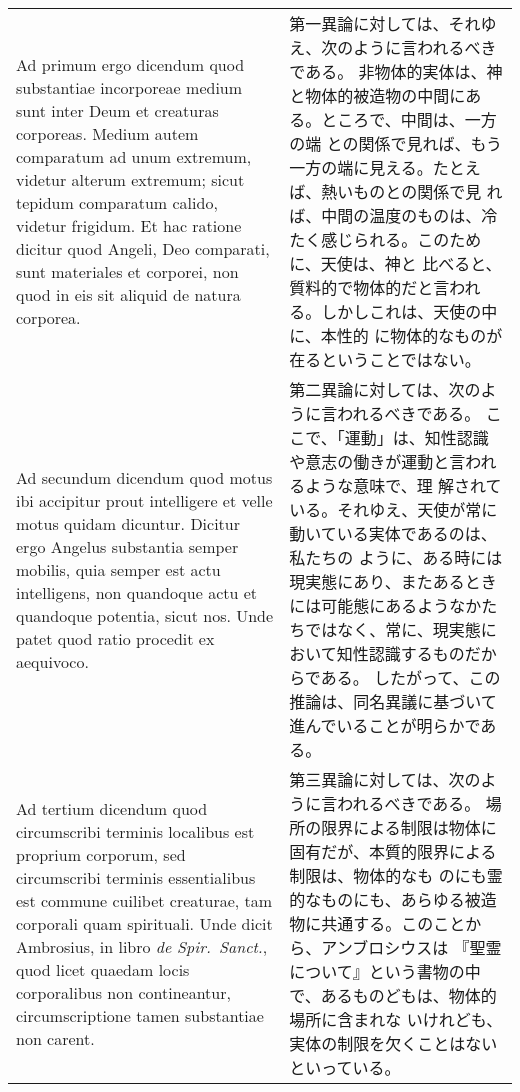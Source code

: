 \documentclass[10pt]{jsarticle} %
\begin{document}
\begin{longtable}{p{21em}p{21em}}
\\


Ad primum ergo dicendum quod substantiae
incorporeae medium sunt inter Deum et creaturas corporeas. Medium autem
comparatum ad unum extremum, videtur alterum extremum; sicut tepidum
comparatum calido, videtur frigidum. Et hac ratione dicitur quod Angeli,
Deo comparati, sunt materiales et corporei, non quod in eis sit aliquid
de natura corporea.


&

第一異論に対しては、それゆえ、次のように言われるべきである。
非物体的実体は、神と物体的被造物の中間にある。ところで、中間は、一方の端
 との関係で見れば、もう一方の端に見える。たとえば、熱いものとの関係で見
 れば、中間の温度のものは、冷たく感じられる。このために、天使は、神と
 比べると、質料的で物体的だと言われる。しかしこれは、天使の中に、本性的
 に物体的なものが在るということではない。


 
\\


Ad secundum dicendum quod motus ibi accipitur
prout intelligere et velle motus quidam dicuntur. Dicitur ergo Angelus
substantia semper mobilis, quia semper est actu intelligens, non
quandoque actu et quandoque potentia, sicut nos. Unde patet quod ratio
procedit ex aequivoco.


&

第二異論に対しては、次のように言われるべきである。
ここで、「運動」は、知性認識や意志の働きが運動と言われるような意味で、理
 解されている。それゆえ、天使が常に動いている実体であるのは、私たちの
 ように、ある時には現実態にあり、またあるときには可能態にあるようなかた
 ちではなく、常に、現実態において知性認識するものだからである。
したがって、この推論は、同名異議に基づいて進んでいることが明らかである。


\\


Ad tertium dicendum quod circumscribi
terminis localibus est proprium corporum, sed circumscribi terminis
essentialibus est commune cuilibet creaturae, tam corporali quam
spirituali. Unde dicit Ambrosius, in libro {\itshape de Spir.~Sanct.}, quod licet
quaedam locis corporalibus non contineantur, circumscriptione tamen
substantiae non carent.


&

第三異論に対しては、次のように言われるべきである。
場所の限界による制限は物体に固有だが、本質的限界による制限は、物体的なも
 のにも霊的なものにも、あらゆる被造物に共通する。このことから、アンブロシウスは
 『聖霊について』という書物の中で、あるものどもは、物体的場所に含まれな
 いけれども、実体の制限を欠くことはないといっている。


\end{longtable}
\newpage
\end{document}
